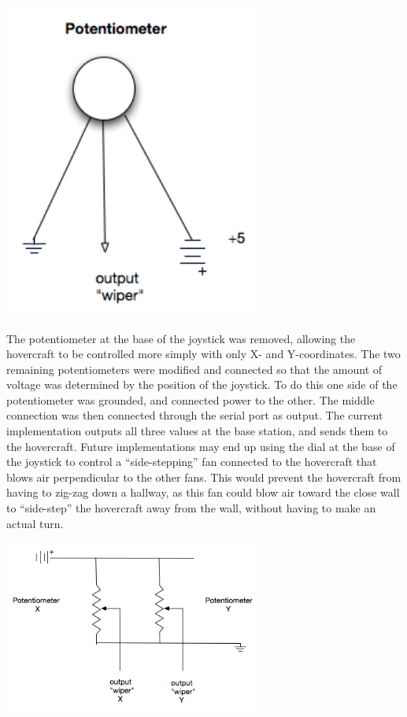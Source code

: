 \begin{center}
  \includegraphics[width=85mm]{imageSources/joystickPotentiometer.png}
\end{center}
\label{joystickPotentiometer}

The potentiometer at the base of the joystick was removed, allowing the hovercraft to be controlled more simply with only X- and Y-coordinates. The two remaining potentiometers were modified and connected so that the amount of voltage was determined by the position of the joystick. To do this one side of the potentiometer was grounded, and connected power to the other. The middle connection was then connected through the serial port as output. The current implementation outputs all three values at the base station, and sends them to the hovercraft. Future implementations may end up using the dial at the base of the joystick to control a ``side-stepping'' fan connected to the hovercraft that blows air perpendicular to the other fans. This would prevent the hovercraft from having to zig-zag down a hallway, as this fan could blow air toward the close wall to ``side-step'' the hovercraft away from the wall, without having to make an actual turn.

\begin{center}
  \includegraphics[width=85mm]{imageSources/potentiometerSchematic.png}
\end{center}
\label{potentiometerSchematic}

